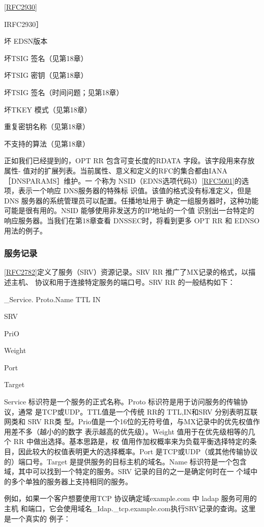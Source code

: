 \href{https://www.rfc-editor.org/rfc/rfc2930}{[RFC2930]}

IRFC2930］

坏 EDSN版本

坏TSIG 签名（见第18章）

坏TSIG 密钥（见第18章）

坏TSIG 签名（时间问题；见第18章）

坏TKEY 模式（见第18章）

重复密钥名称（见第18章）

不支持的算法（见第18章）

正如我们已经提到的，OPT RR 包含可变长度的RDATA 字段。该字段用来存放属性-
值对的扩展列表。当前属性、意义和定义的RFC的集合都由IANA［DNSPARAMS］维护。一
个称为 NSID（EDNS选项代码3）\href{https://www.rfc-editor.org/rfc/rfc5001}{[RFC5001]}的选项，表示一个响应 DNS服务器的特殊标
识值。该值的格式没有标准定义，但是DNS 服务器的系统管理员可以配置。任播地址用于
确定一组服务器时，这种功能可能是很有用的。NSID 能够使用非发送方的IP地址的一个值
识别出一台特定的响应服务器。当我们在第18章查看 DNSSEC时，将看到更多 OPT RR 和
EDNSO用法的例子。

\subsubsection{服务记录}

\href{https://www.rfc-editor.org/rfc/rfc2782}{[RFC2782]}定义了服务（SRV）资源记录。SRV RR 推广了MX记录的格式，以描述主机、
协议和用于连接特定服务的端口号。SRV RR 的一般结构如下：

\_Service. Proto.Name TTL IN

SRV

PriO

Weight

Port

Target

Service 标识符是一个服务的正式名称。Proto 标识符是用于访问服务的传输协议，通常
是TCP或UDP。TTL值是一个传统 RR的 TTL,IN和SRV 分别表明互联网类和 SRV RR类
型。Prio值是一个16位的无符号值，与MX记录中的优先权值作用差不多（越小的的数字
表示越高的优先级）。Weight 值用于在优先级相等的几个 RR 中做出选择。基本思路是，权
值用作加权概率来为负载平衡选择特定的条目，因此较大的权值表明更大的选择概率。Port
是TCP或UDP（或其他传输协议的）端口号。Target 是提供服务的目标主机的域名。Name
标识符是一个包含域，其中可以找到一个特定的服务。SRV 记录的目的之一是确定何时在一
个域中的多个单独的服务器上支持相同的服务。

例如，如果一个客户想要使用TCP 协议确定域example.com 中 ladap 服务可用的主机
和端口，它会使用域名\_Idap.\_tcp.example.com执行SRV记录的查询。这里是一个真实的
例子：

